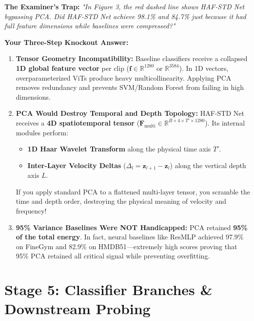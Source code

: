 \documentclass[a4paper, 11pt]{article}
\begin{document}
\begin{trapbox}
\textbf{The Examiner's Trap:} \textit{"In Figure 3, the red dashed line shows HAF-STD Net bypassing PCA. Did HAF-STD Net achieve 98.1\% and 84.7\% just because it had full feature dimensions while baselines were compressed?"}

\textbf{Your Three-Step Knockout Answer:}
\begin{enumerate}
    \item \textbf{Tensor Geometry Incompatibility:}
    Baseline classifiers receive a collapsed \textbf{1D global feature vector} per clip ($\mathbf{f} \in \mathbb{R}^{1280}$ or $\mathbb{R}^{3584}$). In 1D vectors, overparameterized ViTs produce heavy multicollinearity. Applying PCA removes redundancy and prevents SVM/Random Forest from failing in high dimensions.
    \item \textbf{PCA Would Destroy Temporal and Depth Topology:}
    HAF-STD Net receives a \textbf{4D spatiotemporal tensor} ($\mathbf{F}_{\text{multi}} \in \mathbb{R}^{B \times 4 \times T' \times 1280}$). Its internal modules perform:
    \begin{itemize}
        \item \textbf{1D Haar Wavelet Transform} along the physical time axis $T'$.
        \item \textbf{Inter-Layer Velocity Deltas} ($\Delta_l = \mathbf{z}_{l+1} - \mathbf{z}_l$) along the vertical depth axis $L$.
    \end{itemize}
    If you apply standard PCA to a flattened multi-layer tensor, you scramble the time and depth order, destroying the physical meaning of velocity and frequency!
    \item \textbf{95\% Variance Baselines Were NOT Handicapped:}
    PCA retained \textbf{95\% of the total energy}. In fact, neural baselines like ResMLP achieved 97.9\% on FineGym and 82.9\% on HMDB51—extremely high scores proving that 95\% PCA retained all critical signal while preventing overfitting.
\end{enumerate}
\end{trapbox}

\section{Stage 5: Classifier Branches \& Downstream Probing}
\end{document}
